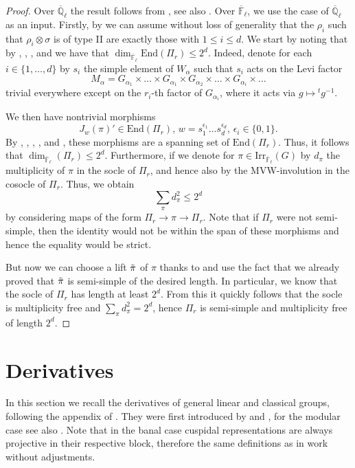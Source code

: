 \documentclass[10pt,a4paper]{article}
\theoremstyle{remark}
\theoremstyle{definition}
\newcommand{\fl}{{\overline{\mathbb{F}}_\ell}}
\newcommand{\ql}{{\overline{\mathbb{Q}}_\ell}}
\newcommand{\ra}{\rightarrow}
\newcommand{\ain}[3]{#1\in\{#2,\ldots,#3\}}
\newcommand{\tpi}{\Tilde{\pi}}
\newcommand{\ed}{\mathrm{End}}
\newcommand{\irr}{\mathrm{Irr}}
\begin{document}
\begin{proof}
    Over $\ql$ the result follows from \cite{arthur2013endoscopic}, see also \cite[§4]{atobe2022soclesclassical}.
    Over $\fl$, we use the case of $\ql$ as an input. 
    Firstly, by  we can assume without loss of generality that the $\rho_i$ such that $\rho_i\otimes \sigma$ is of type II are exactly those with $1\le i\le d$. 
    We start by noting that by , , , and  we have that $\dim_\fl\ed(\Pi_r)\le 2^d$. Indeed, denote for each $\ain{i}{1}{d}$ by $s_i$ the simple element of $W_\alpha$ such that $s_i$ acts on the Levi factor
    \[M_\alpha=G_{\alpha_1}\times \ldots\times G_{\alpha_1}\times G_{\alpha_2}\times\ldots\times G_{\alpha_i}\times\ldots\] trivial everywhere except on the $r_i$-th factor of $G_{\alpha_i}$, where it acts via $g\mapsto {}^tg^{-1}$.
    
     We then have nontrivial morphisms \[J_{w}(\pi)'\in\ed(\Pi_r),\, w=s_1^{\epsilon_1}\ldots s_d^{\epsilon_d},\, \epsilon_i\in\{0,1\}.\]
    By , , , , and \cite[Proposition 7.8]{Dat05}, these morphisms are a spanning set of $\ed(\Pi_r)$.
 Thus, it follows that $\dim_\fl(\Pi_r)\le 2^d$. Furthermore, if we denote for $\pi\in \irr_\fl(G)$ by $d_\pi$ the multiplicity of $\pi$ in the socle of $\Pi_r$, and hence also by the MVW-involution in the cosocle of $\Pi_r$. Thus, we obtain \[\sum_\pi d_\pi^2\le 2^d\] by considering maps of the form $\Pi_r\ra\pi\ra\Pi_r$. Note that if $\Pi_r$ were not semi-simple, then the identity would not be within the span of these morphisms and hence the equality would be strict.

    But now we can choose a lift $\tpi$ of $\pi$ thanks to  and use the fact that we already proved that $\tpi$ is semi-simple of the desired length. In particular, we know that the socle of $\Pi_r$ has length at least $2^d$. From this it quickly follows that the socle is multiplicity free and $\sum_\pi d_\pi^2=2^d$, hence $\Pi_r$ is semi-simple and multiplicity free of length $2^d$.
\end{proof}
\section{Derivatives}\label{S:der}
 In this section we recall the derivatives of general linear and classical groups, following the appendix of \cite{atobe2024local}. They were first introduced by \cite{Min08} and \cite{Jader}, for the modular case see also \cite{Dro24}. Note that in the banal case cuspidal representations are always projective in their respective block, therefore the same definitions as in \cite{atobe2024local} work without adjustments.
 
\end{document}
